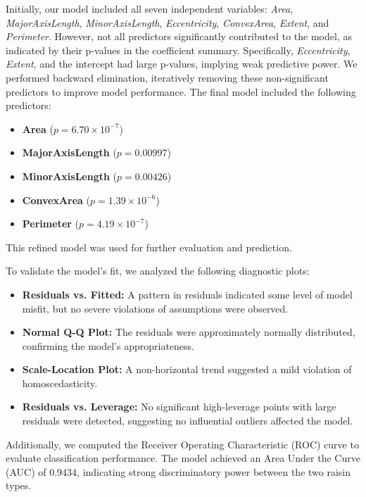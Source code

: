\documentclass{article}
\begin{document}
\hfill\break

Initially, our model included all seven independent variables: \textit{Area}, \textit{MajorAxisLength}, \textit{MinorAxisLength}, \textit{Eccentricity}, \textit{ConvexArea}, \textit{Extent}, and \textit{Perimeter}. However, not all predictors significantly contributed to the model, as indicated by their p-values in the coefficient summary. Specifically, \textit{Eccentricity}, \textit{Extent}, and the intercept had large p-values, implying weak predictive power. We performed backward elimination, iteratively removing these non-significant predictors to improve model performance. The final model included the following predictors:

\begin{itemize}
\item \textbf{Area} ($p = 6.70 \times 10^{-7}$)
\item \textbf{MajorAxisLength} ($p = 0.00997$)
\item \textbf{MinorAxisLength} ($p = 0.00426$)
\item \textbf{ConvexArea} ($p = 1.39 \times 10^{-6}$)
\item \textbf{Perimeter} ($p = 4.19 \times 10^{-7}$)
\end{itemize}

This refined model was used for further evaluation and prediction.
\hfill\break

To validate the model's fit, we analyzed the following diagnostic plots:

\begin{itemize}
\item \textbf{Residuals vs. Fitted:} A pattern in residuals indicated some level of model misfit, but no severe violations of assumptions were observed.
\item \textbf{Normal Q-Q Plot:} The residuals were approximately normally distributed, confirming the model's appropriateness.
\item \textbf{Scale-Location Plot:} A non-horizontal trend suggested a mild violation of homoscedasticity.
\item \textbf{Residuals vs. Leverage:} No significant high-leverage points with large residuals were detected, suggesting no influential outliers affected the model.
\end{itemize}

\hfill\break

Additionally, we computed the Receiver Operating Characteristic (ROC) curve to evaluate classification performance. The model achieved an Area Under the Curve (AUC) of 0.9434, indicating strong discriminatory power between the two raisin types.
\end{document}
